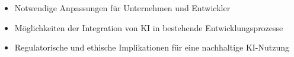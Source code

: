 \begin{itemize}
    \item Notwendige Anpassungen für Unternehmen und Entwickler
    \item Möglichkeiten der Integration von KI in bestehende Entwicklungsprozesse
    \item Regulatorische und ethische Implikationen für eine nachhaltige KI-Nutzung
\end{itemize}